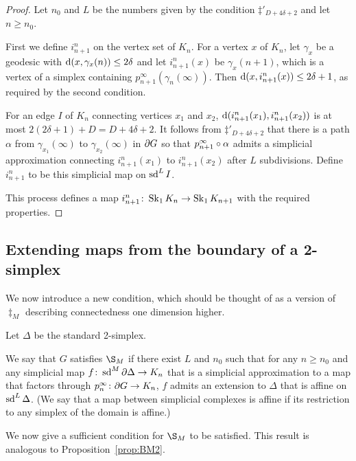 \documentclass[a4paper]{article}
\begin{document}
\begin{proof}
  Let $n_0$ and $L$ be the numbers given by the condition $\ddag'_{D + 4\delta
  + 2}$ and let $n \geq n_0$.

  First we define $i^n_{n+1}$ on the vertex set of $K_n$. For a vertex $x$ of
  $K_n$, let $\gamma_x$ be a geodesic with $\operatorname{d}(x, \gamma_x(n)) \leq 2\delta$
  and let $i^n_{n+1}(x)$ be $\gamma_x(n+1)$, which is a vertex of a simplex
  containing $p^\infty_{n+1}(\gamma_n(\infty))$. Then $\operatorname{d}(x, i^n_{n+1}(x))
  \leq 2\delta + 1$, as required by the second condition.

  For an edge $I$ of $K_n$ connecting vertices $x_1$ and $x_2$,
  $\operatorname{d}(i^n_{n+1}(x_1), i^n_{n+1}(x_2))$ is at most $2(2\delta + 1) + D = D +
  4\delta + 2$. It follows from $\ddag'_{D+4\delta+2}$ that there is a path
  $\alpha$ from $\gamma_{x_1}(\infty)$ to $\gamma_{x_2}(\infty)$ in $\partial
  G$ so that $p^\infty_{n+1}\circ\alpha$ admits a simplicial approximation
  connecting $i^n_{n+1}(x_1)$ to $i^n_{n+1}(x_2)$ after $L$ subdivisions.
  Define $i^n_{n+1}$ to be this simplicial map on $\operatorname{sd}^L I$.

  This process defines a map $i^n_{n+1}\colon \operatorname{Sk}_1 K_n\to \operatorname{Sk}_1 K_{n+1}$
  with the required properties.
\end{proof}

\subsection{Extending maps from the boundary of a 2-simplex}

We now introduce a new condition, which should be thought of as a version of
$\ddag_M$ describing connectedness one dimension higher.

\begin{definition}
  Let $\Delta$ be the standard 2-simplex. 

  We say that $G$ satisfies $\S_M$ if there exist $L$ and $n_0$ such that for
  any $n\geq n_0$ and any simplicial map $f\colon \operatorname{sd}^M\partial\Delta \to K_n$
  that is a simplicial approximation to a map that factors through $p^\infty_n
  \colon \partial G \to K_n$, $f$ admits an extension to $\Delta$ that is
  affine on $\operatorname{sd}^L \Delta$. (We say that a map between simplicial complexes is
  affine if its restriction to any simplex of the domain is affine.)
\end{definition}

We now give a sufficient condition for $\S_M$ to be satisfied. This result is
analogous to Proposition~\ref{prop:BM2}.
\end{document}
